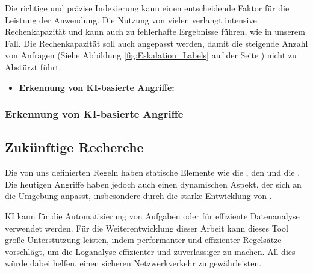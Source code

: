 Die richtige und präzise Indexierung kann einen entscheidende Faktor für die Leistung der Anwendung. Die Nutzung von vielen  verlangt intensive Rechenkapazität und kann auch zu fehlerhafte Ergebnisse führen, wie in unserem Fall. Die Rechenkapazität soll auch angepasst werden, damit die steigende Anzahl von Anfragen (Siehe Abbildung \ref{fig:Eskalation_Labels} auf der Seite \pageref{fig:Eskalation_Labels}) nicht zu Abstürzt führt.

\begin{itemize}[noitemsep]
    \item \textbf{Erkennung von \gls{KI}-basierte Angriffe:}
\end{itemize}
\subsubsection{Erkennung von \gls{KI}-basierte Angriffe}

\subsection{Zukünftige Recherche}

Die von uns definierten Regeln haben statische Elemente wie die , den  und die . Die heutigen Angriffe haben jedoch auch einen dynamischen Aspekt, der sich an die Umgebung anpasst, insbesondere durch die starke Entwicklung von  \citep{Guembe_AIHACKER}. 

\gls{KI} kann für die Automatisierung von Aufgaben oder für effiziente Datenanalyse verwendet werden. Für die Weiterentwicklung dieser Arbeit kann dieses Tool große Unterstützung leisten, indem performanter und effizienter Regelsätze vorschlägt, um die Loganalyse effizienter und zuverlässiger zu machen. All dies würde dabei helfen, einen sicheren Netzwerkverkehr zu gewährleisten.







